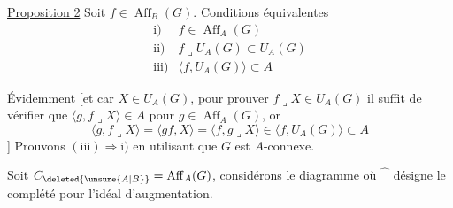 \uline{Proposition 2} Soit $f\in\operatorname{Aff}_B(G)$.  Conditions équivalentes
\[
\begin{array}{ll}
\text{i)}&f\in\operatorname{Aff}_A(G)\\
\text{ii)}&f\mathbin{\lrcorner}U_A(G)\subset U_A(G)\\
\text{iii)}&\langle f,U_A(G)\rangle\subset A
\end{array}
\]
\margin{\unsure{)}}

Évidemment
[et
car  $X\in U_A(G)$, pour prouver $f\mathbin{\lrcorner}X\in U_A(G)$ il suffit  de vérifier que $\langle g,f\mathbin{\lrcorner}X\rangle\in A$ pour $g\in\operatorname{Aff}_A(G)$, or
\[
\langle g,f\mathbin{\lrcorner}X\rangle=\langle gf,X\rangle=\langle f,g\mathbin{\lrcorner}X\rangle
\in\langle f,U_A(G)\rangle\subset A
\]
] Prouvons $(\mathrm{iii})\Rightarrow\mathrm{i})$ en utilisant que $G$ est $A$-connexe.

Soit $C_{\deleted{\unsure{A|B}}}=\operatorname{Aff}_A(G)$, considérons le diagramme
où $\widehat{\phantom C}$ désigne le  complété pour l'idéal d'augmentation.
